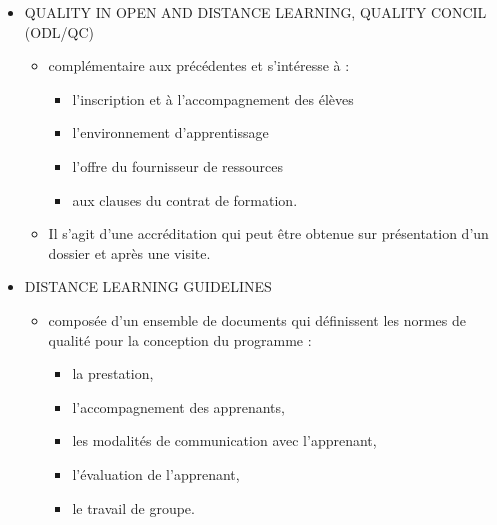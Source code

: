 \begin{frame}[allowframebreaks]
\begin{description}
\begin{itemize}
							\framebreak
							
							\item QUALITY IN OPEN AND DISTANCE LEARNING, QUALITY CONCIL (ODL/QC) 
								\begin{itemize}
								\item complémentaire aux précédentes et s’intéresse à : 
									\begin{itemize}
									\item l’inscription et à l’accompagnement des élèves
									\item l’environnement d’apprentissage
									\item l’offre du fournisseur de ressources
									\item aux clauses du contrat de formation. 
									\end{itemize}
								\item Il s’agit d’une accréditation qui peut être obtenue sur présentation d’un dossier et après
								 une visite.	
								\end{itemize}
							
							\framebreak
							
							\item DISTANCE LEARNING GUIDELINES 
								\begin{itemize}
								\item composée d’un ensemble de documents qui définissent les normes de qualité pour la conception du programme : 
									\begin{itemize}
									\item la prestation, 
									\item l’accompagnement des apprenants, 
									\item les modalités de communication avec l’apprenant,
									\item l’évaluation de l’apprenant, 
									\item le travail de groupe.
									\end{itemize}
								\end{itemize}
							
							\framebreak
							

\end{itemize}
\end{description}
\end{frame}
